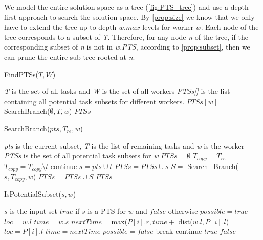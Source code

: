 We model the entire solution space as a tree (\cref{fig:PTS_tree}) and use a depth-first approach to search the solution space. By \cref{prop:size} we know that we only have to extend the tree up to depth $w.max$ levels for worker $w$. Each node of the tree corresponds to a subset of \emph{T}. Therefore, for any node \emph{n} of the tree, if the corresponding subset of \emph{n} is not in \emph{w.PTS}, according to \cref{prop:subset}, then we can prune the entire sub-tree rooted at \emph{n}.

\begin{algorithm}[h]
\caption{FindPTSs($T, W$)}
\label{algo:FindPTS}
\begin{algorithmic}[1]
\REQUIRE \emph{T} is the set of all tasks and \emph{W} is the set of all workers
\ENSURE \emph{PTSs[]} is the list containing all potential task subsets for different workers.
	\STATE $PTSs[w] = $ SearchBranch($\emptyset, T, w$)
\ENDFOR
\RETURN $PTSs$
\end{algorithmic}
\end{algorithm}

\begin{algorithm}[t]
\caption{SearchBranch($pts, T_{re}, w$)}
\label{algo:SearchBranch}
\begin{algorithmic}[1]
\REQUIRE \emph{pts} is the current subset, \emph{T} is the list of remaining tasks and \emph{w} is the worker
\ENSURE \emph{PTSs} is the set of all potential task subsets for \emph{w}
\STATE $PTSs = \emptyset$
\STATE $T_{copy} = T_{re}$
	\STATE $T_{copy} = T_{copy} \setminus t$
		\STATE continue
	\ENDIF
	\STATE $s = pts \cup t$
		\STATE $PTSs = PTSs \cup s$
			\STATE $S =$ Search\_Branch($s, T_{copy}, w$)
			\STATE $PTSs = PTSs \cup S$
		\ENDIF
	\ENDIF
\ENDFOR
\RETURN $PTSs$
\end{algorithmic}
\end{algorithm}

\begin{algorithm}[t]
\caption{IsPotentialSubset($s, w$)}
\label{algo:IsPTS}
\begin{algorithmic}[1]
\REQUIRE $s$ is the input set
\ENSURE $true$ if $s$ is a PTS for $w$ and $false$ otherwise
	\STATE $possible = true$
	\STATE $loc = w.l$
	\STATE $time = w.s$
		\STATE $nextTime = $max($P[i].r, time +$ dist($w.l, P[i].l$)
			\STATE $loc = P[i].l$
			\STATE $time = nextTime$
		\ELSE
			\STATE $possible = false$
			\STATE break
		\ENDIF
	\ENDFOR
		\STATE continue
	\ELSE
		\RETURN $true$
	\ENDIF
\ENDFOR
\RETURN $false$
\end{algorithmic}
\end{algorithm}

